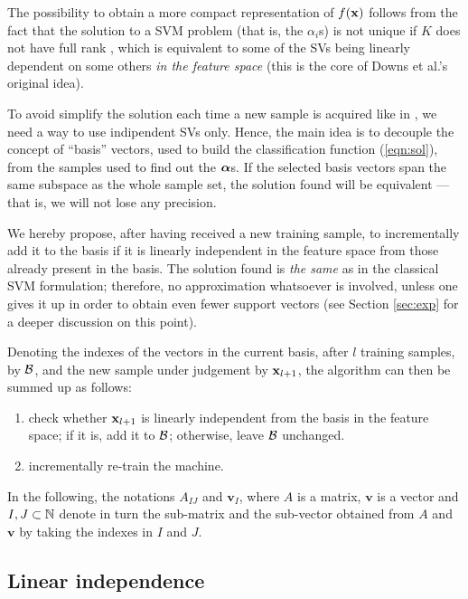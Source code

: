 The possibility to obtain a more compact representation of $f(\xx)$
follows from the fact that the solution to a SVM problem (that is, the
$\alpha_i$s) is not unique if $K$ does not have full rank
\cite{Burges98}, which is equivalent to some of the SVs being linearly
dependent on some others \emph{in the feature space} (this is the core
of Downs et al.'s \cite{DownsGM01} original idea).

To avoid simplify the solution each time a new sample is acquired like
in \cite{DownsGM01}, we need a way to use indipendent SVs only. Hence,
the main idea is to decouple the concept of ``basis'' vectors, used to
build the classification function (\ref{eqn:sol}), from the samples
used to find out the $\aa$s. If the selected basis vectors span the
same subspace as the whole sample set, the solution found will be
equivalent --- that is, we will not lose any precision.

We hereby propose, after having received a new training sample, to
incrementally add it to the basis if it is linearly independent in the
feature space from those already present in the basis.  The solution
found is \emph{the same} as in the classical SVM formulation;
therefore, no approximation whatsoever is involved, unless one gives
it up in order to obtain even fewer support vectors (see Section
\ref{sec:exp} for a deeper discussion on this point).

Denoting the indexes of the vectors in the current basis, after $l$
training samples, by $\b$, and the new sample under judgement by
$\xx_{l+1}$, the algorithm can then be summed up as follows:

\begin{enumerate}

  \item check whether $\xx_{l+1}$ is linearly independent from the
        basis in the feature space; if it is, add it to $\b$;
        otherwise, leave $\b$ unchanged.

  \item incrementally re-train the machine.

\end{enumerate}

In the following, the notations $A_{IJ}$ and $\mathbf{v}_I$, where $A$
is a matrix, $\mathbf{v}$ is a vector and $I,J \subset \NN$ denote in
turn the sub-matrix and the sub-vector obtained from $A$ and
$\mathbf{v}$ by taking the indexes in $I$ and $J$.

\subsection{Linear independence}

